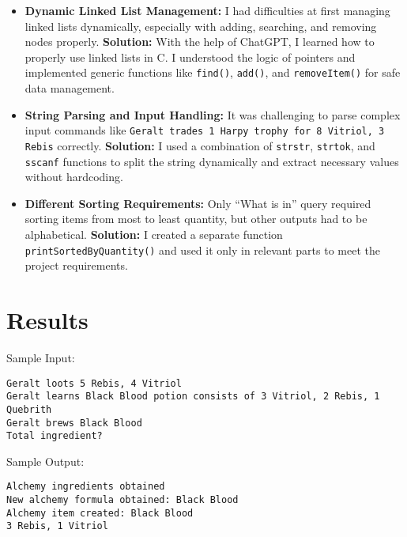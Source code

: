 \documentclass[a4paper,12pt]{article}
\begin{document}
\begin{itemize}
    \item \textbf{Dynamic Linked List Management:}  
    I had difficulties at first managing linked lists dynamically, especially with adding, searching, and removing nodes properly. 
    \newline
    \textbf{Solution:} With the help of ChatGPT, I learned how to properly use linked lists in C. I understood the logic of pointers and implemented generic functions like \texttt{find()}, \texttt{add()}, and \texttt{removeItem()} for safe data management.

    \item \textbf{String Parsing and Input Handling:}  
    It was challenging to parse complex input commands like \texttt{Geralt trades 1 Harpy trophy for 8 Vitriol, 3 Rebis} correctly.
    \newline
    \textbf{Solution:} I used a combination of \texttt{strstr}, \texttt{strtok}, and \texttt{sscanf} functions to split the string dynamically and extract necessary values without hardcoding.

    \item \textbf{Different Sorting Requirements:}  
    Only ``What is in'' query required sorting items from most to least quantity, but other outputs had to be alphabetical.
    \newline
    \textbf{Solution:} I created a separate function \texttt{printSortedByQuantity()} and used it only in relevant parts to meet the project requirements.

    
\end{itemize}



\section{Results}

Sample Input:

\begin{verbatim}
Geralt loots 5 Rebis, 4 Vitriol
Geralt learns Black Blood potion consists of 3 Vitriol, 2 Rebis, 1 Quebrith
Geralt brews Black Blood
Total ingredient?
\end{verbatim}

Sample Output:

\begin{verbatim}
Alchemy ingredients obtained
New alchemy formula obtained: Black Blood
Alchemy item created: Black Blood
3 Rebis, 1 Vitriol
\end{verbatim}
\end{document}
